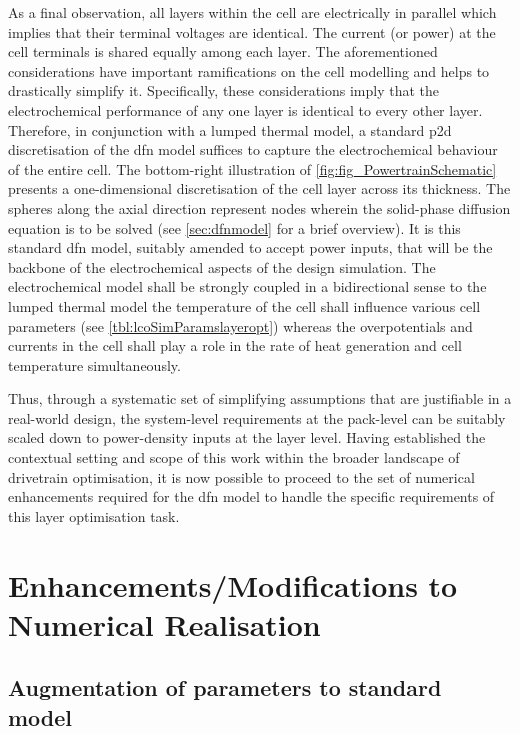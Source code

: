 As a final observation, all layers  within the cell are electrically in parallel
which implies that their terminal voltages are identical. The current (or power)
at the  cell terminals is  shared equally  among each layer.  The aforementioned
considerations have important  ramifications on the cell modelling  and helps to
drastically  simplify  it. Specifically,  these  considerations  imply that  the
electrochemical  performance  of any  one  layer  is  identical to  every  other
layer.  Therefore,  in conjunction  with  a  lumped  thermal model,  a  standard
\gls{p2d}  discretisation  of  the  \gls{dfn}  model  suffices  to  capture  the
electrochemical behaviour of  the entire cell. The  bottom-right illustration of
\cref{fig:fig_PowertrainSchematic} presents a  one-dimensional discretisation of
the  cell layer  across its  thickness. The  spheres along  the axial  direction
represent nodes wherein the solid-phase diffusion  equation is to be solved (see
\cref{sec:dfnmodel} for a brief overview).  It is this standard \gls{dfn} model,
suitably  amended to  accept power  inputs,  that will  be the  backbone of  the
electrochemical  aspects of  the  design simulation.  The electrochemical  model
shall be strongly  coupled in a bidirectional sense to  the lumped thermal model
\ie{} the temperature  of the cell shall influence various  cell parameters (see
\cref{tbl:lcoSimParamslayeropt}) whereas the overpotentials  and currents in the
cell shall  play a  role in  the rate  of heat  generation and  cell temperature
simultaneously.

Thus, through a  systematic set of simplifying assumptions  that are justifiable
in a real-world  design, the system-level requirements at the  pack-level can be
suitably  scaled  down  to  power-density  inputs at  the  layer  level.  Having
established the  contextual setting and  scope of  this work within  the broader
landscape of drivetrain  optimisation, it is now possible to  proceed to the set
of  numerical  enhancements required  for  the  \gls{dfn}  model to  handle  the
specific requirements of this layer optimisation task.

\section{Enhancements/Modifications to Numerical Realisation}
\subsection{Augmentation of parameters to standard  model}

